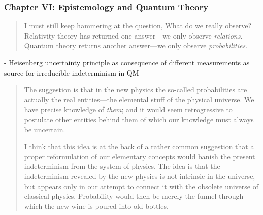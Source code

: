 \subsubsection{Chapter VI: Epistemology and Quantum Theory}

\begin{quote}
    I must still keep hammering at the question, What do we really observe?  Relativity theory has returned one answer---we only observe \emph{relations}.  Quantum theory returns another answer---we only observe \emph{probabilities}. \citep[p. 89]{Eddington1939}
\end{quote}

- Heisenberg uncertainty principle as consequence of different measurements as source for irreducible indeterminism in QM

\begin{quote}
    The suggestion is that in the new physics the so-called probabilities are actually the real entities---the elemental stuff of the physical universe.  We have precise knowledge of \emph{them}; and it would seem retrogressive to postulate other entities behind them of which our knowledge must always be uncertain.  

    I think that this idea is at the back of a rather common suggestion that a proper reformulation of our elementary concepts would banish the present indeterminism from the system of physics.  The idea is that the indeterminism revealed by the new physics is not intrinsic in the universe, but appears only in our attempt to connect it with the obsolete universe of classical physics.  Probability would then be merely the funnel through which the new wine is poured into old bottles.  


\end{quote}
